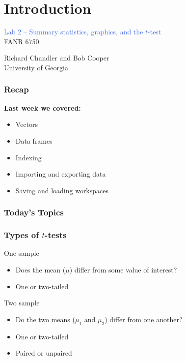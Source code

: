 \documentclass[color=usenames,dvipsnames]{beamer}\usepackage[]{graphicx}\usepackage[]{color}
\begin{document}



\section{Introduction}



\begin{frame}
  \LARGE
  \centering \par
  \textcolor{RoyalBlue}{\huge %
    Lab 2 -- Summary statistics,
    graphics, and the $t$-test} \\
  \vspace{1cm}
  FANR 6750 \par
  \vfill
  \large
  Richard Chandler and Bob Cooper \\
  University of Georgia \\
\end{frame}




\begin{frame}[plain]
  \frametitle{Recap}
  \Large
  {\bf Last week we covered:}
  \begin{itemize}
    \item Vectors
    \item Data frames
    \item Indexing
    \item Importing and exporting data
    \item Saving and loading workspaces
  \end{itemize}
\end{frame}






\begin{frame}[plain]
  \frametitle{Today's Topics}
  \Large
\end{frame}



\begin{frame}
  \frametitle{Types of $t$-tests}
  One sample
  \begin{itemize}
    \item Does the mean ($\mu$) differ from some value of interest?
    \item One or two-tailed
  \end{itemize}
  \pause
  \vfill
  Two sample
  \begin{itemize}
    \item Do the two means ($\mu_1$ and $\mu_2$) differ from one another?
    \item One or two-tailed
    \item Paired or unpaired
  \end{itemize}
\end{frame}
\end{document}
